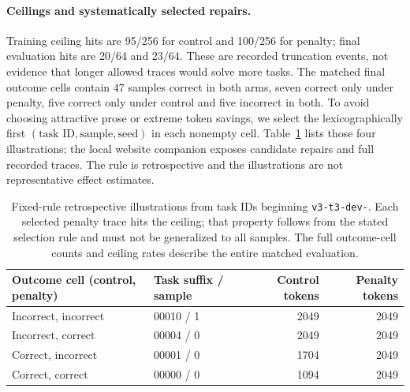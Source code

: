 \documentclass[11pt]{article}
\begin{document}
\paragraph{Ceilings and systematically selected repairs.}
Training ceiling hits are 95/256 for control and 100/256 for penalty; final evaluation hits are 20/64 and 23/64. These are recorded truncation events, not evidence that longer allowed traces would solve more tasks. The matched final outcome cells contain 47 samples correct in both arms, seven correct only under penalty, five correct only under control and five incorrect in both. To avoid choosing attractive prose or extreme token savings, we select the lexicographically first $(\text{task ID},\text{sample},\text{seed})$ in each nonempty cell. Table~\ref{tab:examples} lists those four illustrations; the local website companion exposes candidate repairs and full recorded traces. The rule is retrospective and the illustrations are not representative effect estimates.

\begin{table}[htbp]\centering\small
\begin{tabular}{llrr}
\toprule
Outcome cell (control, penalty)&Task suffix / sample&Control tokens&Penalty tokens\\
\midrule
Incorrect, incorrect&00010 / 1&2049&2049\\
Incorrect, correct&00004 / 0&2049&2049\\
Correct, incorrect&00001 / 0&1704&2049\\
Correct, correct&00000 / 0&1094&2049\\
\bottomrule
\end{tabular}
\caption{Fixed-rule retrospective illustrations from task IDs beginning \texttt{v3-t3-dev-}. Each selected penalty trace hits the ceiling; that property follows from the stated selection rule and must not be generalized to all samples. The full outcome-cell counts and ceiling rates describe the entire matched evaluation.}
\label{tab:examples}
\end{table}
\end{document}
